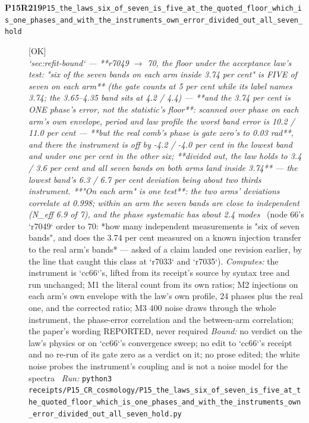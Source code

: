 \begin{description}
\item[\textbf{P15R219}\quad\texttt{P15\_the\_laws\_six\_of\_seven\_is\_five\_at\_the\_quoted\_floor\_which\_is\_one\_phases\_and\_with\_the\_instruments\_own\_error\_divided\_out\_all\_seven\_hold}]\hfill\textsf{[OK]}\\
\textit{`sec:refit-bound` --- **r7049 \ensuremath{\to} 70, the floor under the acceptance law's test: "six of the seven bands on each arm inside 3.74 per cent" is FIVE of seven on each arm** (the gate counts at 5 per cent while its label names 3.74; the 3.65--4.35 band sits at 4.2 / 4.4) --- **and the 3.74 per cent is ONE phase's error, not the statistic's floor**: scanned over phase on each arm's own envelope, period and law profile the worst band error is 10.2 / 11.0 per cent --- **but the real comb's phase is gate zero's to 0.03 rad**, and there the instrument is off by -4.2 / -4.0 per cent in the lowest band and under one per cent in the other six; **divided out, the law holds to 3.4 / 3.6 per cent and all seven bands on both arms land inside 3.74** --- the lowest band's 6.3 / 6.7 per cent deviation being about two thirds instrument. **"On each arm" is one test**: the two arms' deviations correlate at 0.998; within an arm the seven bands are close to independent (N\_eff 6.9 of 7), and the phase systematic has about 2.4 modes} \ (node 66's `r7049` order to 70: *how many independent measurements is "six of seven bands", and does the 3.74 per cent measured on a known injection transfer to the real arm's bands* --- asked of a claim landed one revision earlier, by the line that caught this class at `r7033` and `r7035`). 
\emph{Computes:} the instrument is `cc66`'s, lifted from its receipt's source by syntax tree and run unchanged; M1 the literal count from its own ratios; M2 injections on each arm's own envelope with the law's own profile, 24 phases plus the real one, and the corrected ratio; M3 400 noise draws through the whole instrument, the phase-error correlation and the between-arm correlation; the paper's wording REPORTED, never required
 \emph{Bound:}  no verdict on the law's physics or on `cc66`'s convergence sweep; no edit to `cc66`'s receipt and no re-run of its gate zero as a verdict on it; no prose edited; the white noise probes the instrument's coupling and is not a noise model for the spectra
\ \emph{Run:} \texttt{python3 receipts/P15\_CR\_cosmology/P15\_the\_laws\_six\_of\_seven\_is\_five\_at\_the\_quoted\_floor\_which\_is\_one\_phases\_and\_with\_the\_instruments\_own\_error\_divided\_out\_all\_seven\_hold.py}

\end{description}
